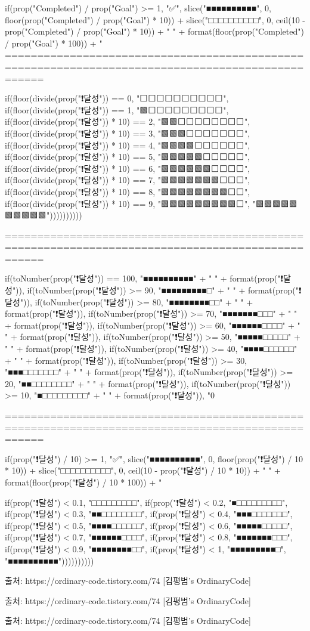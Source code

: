 
if(prop("Completed") / prop("Goal") >= 1, 
"✅", slice("■■■■■■■■■■", 0, floor(prop("Completed") 
/ prop("Goal") * 10)) + slice("□□□□□□□□□□", 0, ceil(10 - prop("Completed") / prop("Goal") * 10)) 
+ " " + format(floor(prop("Completed") / prop("Goal") * 100)) + "%
==================================================================================================

if(floor(divide(prop("❗달성")) == 0, "⬜⬜⬜⬜⬜⬜⬜⬜⬜⬜", 
if(floor(divide(prop("❗달성")) == 1, "🟩⬜⬜⬜⬜⬜⬜⬜⬜⬜", 
if(floor(divide(prop("❗달성")) * 10) == 2, "🟩🟩⬜⬜⬜⬜⬜⬜⬜⬜", 
if(floor(divide(prop("❗달성")) * 10) == 3, "🟩🟩🟩⬜⬜⬜⬜⬜⬜⬜", 
if(floor(divide(prop("❗달성")) * 10) == 4, "🟩🟩🟩🟩⬜⬜⬜⬜⬜⬜", 
if(floor(divide(prop("❗달성")) * 10) == 5, "🟩🟩🟩🟩🟩⬜⬜⬜⬜⬜", 
if(floor(divide(prop("❗달성")) * 10) == 6, "🟩🟩🟩🟩🟩🟩⬜⬜⬜⬜", 
if(floor(divide(prop("❗달성")) * 10) == 7, "🟩🟩🟩🟩🟩🟩🟩⬜⬜⬜", 
if(floor(divide(prop("❗달성")) * 10) == 8, "🟩🟩🟩🟩🟩🟩🟩🟩⬜⬜", 
if(floor(divide(prop("❗달성")) * 10) == 9, "🟩🟩🟩🟩🟩🟩🟩🟩🟩⬜",
"🟩🟩🟩🟩🟩🟩🟩🟩🟩🟩"))))))))))








==================================================================================================

if(toNumber(prop("❗달성")) == 100, "■■■■■■■■■■" + " " + format(prop("❗달성")), 
if(toNumber(prop("❗달성")) >= 90, "■■■■■■■■■□" + " " + format(prop("❗달성")), 
if(toNumber(prop("❗달성")) >= 80, "■■■■■■■■□□" + " " + format(prop("❗달성")), 
if(toNumber(prop("❗달성")) >= 70, "■■■■■■■□□□" + " " + format(prop("❗달성")), 
if(toNumber(prop("❗달성")) >= 60, "■■■■■■□□□□" + " " + format(prop("❗달성")), 
if(toNumber(prop("❗달성")) >= 50, "■■■■■□□□□□" + " " + format(prop("❗달성")), 
if(toNumber(prop("❗달성")) >= 40, "■■■■□□□□□□" + " " + format(prop("❗달성")), 
if(toNumber(prop("❗달성")) >= 30, "■■■□□□□□□□" + " " + format(prop("❗달성")), 
if(toNumber(prop("❗달성")) >= 20, "■■□□□□□□□□" + " " + format(prop("❗달성")), 
if(toNumber(prop("❗달성")) >= 10, "■□□□□□□□□□" + " " + format(prop("❗달성")), "0%

==================================================================================================


if(prop("❗달성") / 10) >= 1, 
"✅", slice("■■■■■■■■■■", 0, floor(prop("❗달성") 
/ 10 * 10)) + slice("□□□□□□□□□□", 0, ceil(10 - prop("❗달성") / 10 * 10)) 
+ " " + format(floor(prop("❗달성") / 10 * 100)) + "%




if(prop("❗달성") < 0.1, "□□□□□□□□□",
if(prop("❗달성") < 0.2, "■□□□□□□□□□",
if(prop("❗달성") < 0.3, "■■□□□□□□□□",
if(prop("❗달성") < 0.4, "■■■□□□□□□□",
if(prop("❗달성") < 0.5, "■■■■□□□□□□",
if(prop("❗달성") < 0.6, "■■■■■□□□□□",
if(prop("❗달성") < 0.7, "■■■■■■□□□□",
if(prop("❗달성") < 0.8, "■■■■■■■□□□",
if(prop("❗달성") < 0.9, "■■■■■■■■□□",
if(prop("❗달성") < 1, "■■■■■■■■■□",
"■■■■■■■■■■"))))))))))

출처: https://ordinary-code.tistory.com/74 [김평범's OrdinaryCode]

출처: https://ordinary-code.tistory.com/74 [김평범's OrdinaryCode]

출처: https://ordinary-code.tistory.com/74 [김평범's OrdinaryCode]